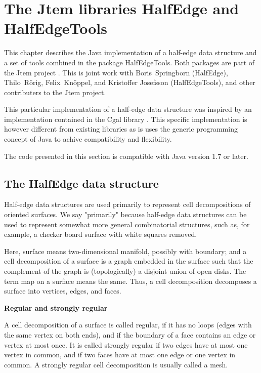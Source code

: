\documentclass[Thesis.tex]{subfiles}
\begin{document}
\chapter{The {\sc Jtem} libraries {\sc HalfEdge} and {\sc HalfEdgeTools}}
\label{chp:halfedge}

This chapter describes the {\sc Java} implementation of a half-edge data structure and a set of tools
combined in the package {\sc HalfEdgeTools}. Both packages are part of the {\sc Jtem} project
\cite{JtemWebsite}. This is joint work with Boris~Springborn ({\sc HalfEdge}), Thilo~R{\"o}rig, 
Felix~Kn{\"o}ppel, and Kristoffer Josefsson ({\sc HalfEdgeTools}), and
other contributers to the {\sc Jtem} project.

This particular implementation of a half-edge data structure was inspired by an implementation 
contained in the {\sc Cgal} library \cite{Kettner2000}.
This specific implementation is however different from existing libraries as is uses the generic
programming concept of {\sc Java} to achive compatibility and flexibility.

The code presented in this section is compatible with {\sc Java} version 1.7 or later.

\label{sec:halfedge_halfedgetools}
\section{The {\sc HalfEdge} data structure}
\label{sec:halfedge}

Half-edge data structures are used primarily to represent cell decompositions of oriented surfaces.
We say "primarily" because half-edge data structures can be used to represent somewhat more general
combinatorial structures, such as, for example, a checker board surface with white squares removed.

Here, surface means two-dimensional manifold, possibly with boundary; and a cell decomposition 
of a surface is a graph embedded in the surface such that the complement of the graph is 
(topologically) a disjoint union of open disks. The term map on a surface means the same. 
Thus, a cell decomposition decomposes a surface into vertices, edges, and faces.

{\bf Regular and strongly regular}

A cell decomposition of a surface is called regular, if it has no loops (edges with the same vertex 
on both ends), and if the boundary of a face contains an edge or vertex at most once. It is called 
strongly regular if two edges have at most one vertex in common, and if two faces have at most 
one edge or one vertex in common. A strongly regular cell decomposition is usually called a mesh.
\end{document}
